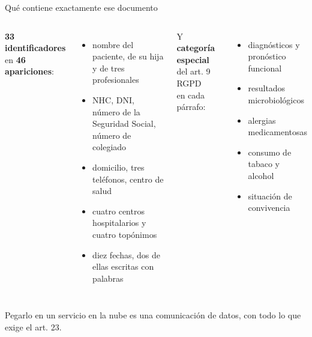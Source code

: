 \documentclass[aspectratio=169,11pt]{beamer}
\begin{document}
\begin{frame}{Qué contiene exactamente ese documento}
  \begin{columns}[T]
      \textbf{33 identificadores} en \textbf{46 apariciones}:
      \vspace{.4em}
      \begin{itemize}\small
        \item nombre del paciente, de su hija y de tres profesionales
        \item NHC, DNI, número de la Seguridad Social, número de colegiado
        \item domicilio, tres teléfonos, centro de salud
        \item cuatro centros hospitalarios y cuatro topónimos
        \item diez fechas, dos de ellas escritas con palabras
      \end{itemize}
      \vspace{.6em}
      Y \textbf{categoría especial} del art. 9 RGPD\\ en cada párrafo:
      \vspace{.4em}
      \begin{itemize}\small
        \item diagnósticos y pronóstico funcional
        \item resultados microbiológicos
        \item alergias medicamentosas
        \item consumo de tabaco y alcohol
        \item situación de convivencia
      \end{itemize}
  \end{columns}
  \vspace{.5em}
  \centering\footnotesize Pegarlo en un servicio en la nube es una comunicación
  de datos, con todo lo que exige el art. 23.
\end{frame}
\end{document}
